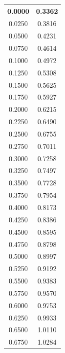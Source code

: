 \documentclass[a4paper,11pt]{article}
\begin{document}
\begin{table}[H]
\begin{subtable}[t]{.5\textwidth}
\begin{adjustbox}{height =9cm ,center}
\begin{tabular}{|c|c|}
\hline                   
0.0000 & 0.3362 \\        
\hline                    
0.0250 & 0.3816 \\        
\hline                    
0.0500 & 0.4231 \\        
\hline                    
0.0750 & 0.4614 \\        
\hline                    
0.1000 & 0.4972 \\        
\hline                    
0.1250 & 0.5308 \\        
\hline                    
0.1500 & 0.5625 \\        
\hline                    
0.1750 & 0.5927 \\        
\hline                    
0.2000 & 0.6215 \\        
\hline                    
0.2250 & 0.6490 \\        
\hline                    
0.2500 & 0.6755 \\        
\hline                    
0.2750 & 0.7011 \\        
\hline                    
0.3000 & 0.7258 \\        
\hline                    
0.3250 & 0.7497 \\        
\hline                    
0.3500 & 0.7728 \\        
\hline                    
0.3750 & 0.7954 \\        
\hline                    
0.4000 & 0.8173 \\        
\hline                    
0.4250 & 0.8386 \\        
\hline                    
0.4500 & 0.8595 \\        
\hline                    
0.4750 & 0.8798 \\        
\hline                    
0.5000 & 0.8997 \\        
\hline                    
0.5250 & 0.9192 \\        
\hline                    
0.5500 & 0.9383 \\        
\hline                    
0.5750 & 0.9570 \\        
\hline                    
0.6000 & 0.9753 \\        
\hline                    
0.6250 & 0.9933 \\        
\hline                    
0.6500 & 1.0110 \\        
\hline                    
0.6750 & 1.0284 \\        

\end{tabular}
\end{adjustbox}
\end{subtable}
\end{table}
\end{document}

